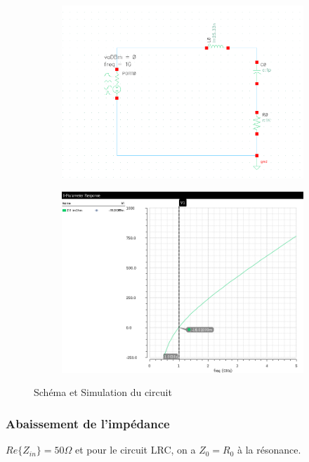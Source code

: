 \documentclass[a4paper]{article}
\begin{document}
\begin{figure}[!htb]
  \begin{subfigure}[t]{.5\linewidth}
      \centering
      \includegraphics[width=1.1\linewidth]{circuit-LRC.png}
      \label{fig:rccircuit}
  \end{subfigure}%
  \begin{subfigure}[t]{.5\linewidth}
    \centering
    \includegraphics[width=1\linewidth]{sim-LRC.png}
    \label{fig:rccircuit-sim}
  \end{subfigure}%
  \caption{Sch\'ema et Simulation du circuit}
  \label{fig:RC-sim}
\end{figure}

\subsubsection{Abaissement de l'imp\'edance}
$Re\{Z_{in}\} = 50 \Omega$ et pour le circuit LRC, on a $Z_0 = R_0$ \`a la r\'esonance.
\end{document}
